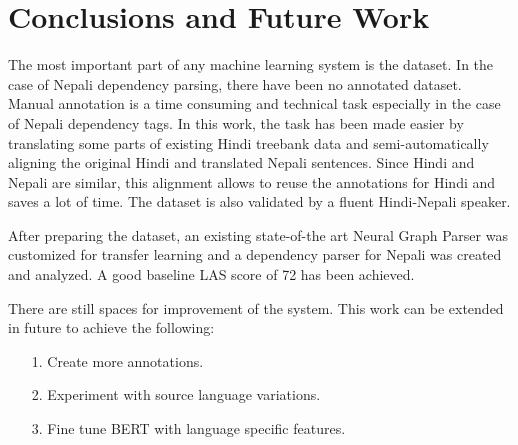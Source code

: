 \chapter{Conclusions and Future Work}
The most important part of any machine learning system is the dataset.
In the case of Nepali dependency parsing, there have been no annotated
dataset. Manual annotation is a time consuming and technical task
especially in the case of Nepali dependency tags. In this work, the
task has been made easier by translating some parts of existing Hindi
treebank data and semi-automatically aligning the original Hindi and
translated Nepali sentences. Since Hindi and Nepali are similar, this
alignment allows to reuse the annotations for Hindi and saves a lot of
time. The dataset is also validated by a fluent Hindi-Nepali speaker.

After preparing the dataset, an existing state-of-the art Neural
Graph Parser was customized for transfer learning and a dependency
parser for Nepali was created and analyzed. A good baseline LAS score
of 72 has been achieved.

There are still spaces for improvement of the system. This work can be
extended in future to achieve the following:
\begin{itemize}
    \item [1.] Create more annotations.
    \item [2.] Experiment with source language variations.
    \item [3.] Fine tune BERT with language specific features.
\end{itemize}
